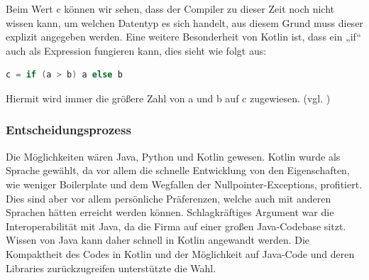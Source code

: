 Beim Wert c können wir sehen, dass der Compiler zu dieser Zeit noch nicht wissen kann, um welchen Datentyp es sich handelt, aus diesem Grund muss dieser explizit angegeben werden.
Eine weitere Besonderheit von Kotlin ist, dass ein „if“ auch als Expression fungieren kann, dies sieht wie folgt aus:
\vspace{3mm}\par
\begin{lstlisting}[caption={if-Expression}, language=Kotlin]
c = if (a > b) a else b
\end{lstlisting}
\vspace{4mm}\par
Hiermit wird immer die größere Zahl von a und b auf c zugewiesen.
(vgl. \cite{Kotlin-Basic-Syntax})
\subsubsection{Entscheidungsprozess}
Die Möglichkeiten wären Java, Python und Kotlin gewesen. Kotlin wurde als Sprache gewählt, da vor allem die schnelle Entwicklung von den Eigenschaften, wie weniger Boilerplate und dem Wegfallen der Nullpointer-Exceptions, profitiert. Dies sind aber vor allem persönliche Präferenzen, welche auch mit anderen Sprachen hätten erreicht werden können. Schlagkräftiges Argument war die Interoperabilität mit Java, da die Firma auf einer großen Java-Codebase sitzt. Wissen von Java kann daher schnell in Kotlin angewandt werden. Die Kompaktheit des Codes in Kotlin und der Möglichkeit auf Java-Code und deren Libraries zurückzugreifen unterstützte die Wahl.
